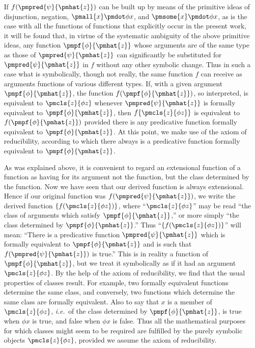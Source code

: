 \documentclass[letterpaper,12pt,openany,leqno]{book}
\newcommand{\pagefirst}[1]{\marginnote[\boxed{\text{#1}}]{\boxed{\text{#1}}}}
\begin{document}
If $f(\pmpred{\psi}{\pmhat{z}})$ can be built up by means of the primitive ideas of disjunction, negation, $\pmall{x}\pmdot \phi x$, and $\pmsome{x}\pmdot \phi x$, as is the case with all the functions of functions that explicitly occur in the present work, it will be found that, in virtue of the systematic ambiguity of the above primitive ideas, any function $\pmpf{\phi}{\pmhat{z}}$ whose arguments are of the same type as those of $\pmpred{\psi}{\pmhat{z}}$ can significantly be substituted for $\pmpred{\psi}{\pmhat{z}}$ in $f$ without any other symbolic change. Thus in \pagefirst{79} such a case what is symbolically, though not really, the same function $f$ can receive as arguments functions of various different types. If, with a given argument $\pmpf{\phi}{\pmhat{z}}$, the function $f(\pmpf{\phi}{\pmhat{z}})$, so interpreted, is equivalent to $\pmcls{z}{\phi z}$ whenever $\pmpred{\psi}{\pmhat{z}}$ is formally equivalent to $\pmpf{\phi}{\pmhat{z}}$, then $f\{\pmcls{z}{\phi z}\}$ is equivalent to $f(\pmpf{\phi}{\pmhat{z}})$ provided there is any predicative function formally equivalent to $\pmpf{\phi}{\pmhat{z}}$. At this point, we make use of the axiom of reducibility, according to which there always is a predicative function formally equivalent to $\pmpf{\phi}{\pmhat{z}}$.

As was explained above, it is convenient to regard an extensional function of a function as having for its argument not the function, but the class determined by the function. Now we have seen that our derived function is always extensional. Hence if our original function was $f(\pmpred{\psi}{\pmhat{z}})$, we write the derived function $\{f(\pmcls{z}{\phi z})\}$, where ``$\pmcls{z}{\phi z}$'' may be read ``the class of arguments which satisfy $\pmpf{\phi}{\pmhat{z}}$,'' or more simply ``the class determined by $\pmpf{\phi}{\pmhat{z}}$.'' Thus ``$\{f(\pmcls{z}{\phi z})\}$'' will mean: ``There is a predicative function $\pmpred{\psi}{\pmhat{z}}$ which is formally equivalent to $\pmpf{\phi}{\pmhat{z}}$ and is such that $f(\pmpred{\psi}{\pmhat{z}})$ is true.'' This is in reality a function of $\pmpf{\phi}{\pmhat{z}}$, but we treat it symbolically as if it had an argument $\pmcls{z}{\phi z}$. By the help of the axiom of reducibility, we find that the usual properties of classes result. For example, two formally equivalent functions determine the same class, and conversely, two functions which determine the same class are formally equivalent. Also to say that $x$ is a member of $\pmcls{z}{\phi z}$, \textit{i.e.}\ of the class determined by $\pmpf{\phi}{\pmhat{z}}$, is true when $\phi x$ is true, and false when $\phi x$ is false. Thus all the mathematical purposes for which classes might seem to be required are fulfilled by the purely symbolic objects $\pmcls{z}{\phi z}$, provided we assume the axiom of reducibility.
\end{document}
